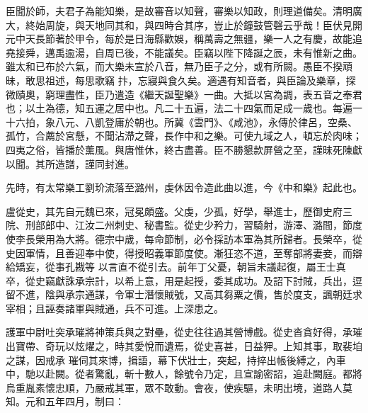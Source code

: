 \begin{pinyinscope}
 臣聞於師，夫君子為能知樂，是故審音以知聲，審樂以知政，則理道備矣。清明廣大，終始周旋，與天地同其和，與四時合其序，豈止於鐘鼓管磬云乎哉！臣伏見開元中天長節著於甲令，每於是日海縣歡娛，稱萬壽之無疆，樂一人之有慶，故能追堯接舜，邁禹逾湯，自周已後，不能議矣。臣竊以陛下降誕之辰，未有惟新之曲。雖太和已布於六氣，而大樂未宣於八音，無乃臣子之分，或有所闕。愚臣不揆頑昧，敢思祖述，每思歌竊
 抃，忘寢與食久矣。適遇有知音者，與臣論及樂章，探微賾奧，窮理盡性，臣乃遣造《繼天誕聖樂》一曲。大抵以宮為調，表五音之奉君也；以土為德，知五運之居中也。凡二十五遍，法二十四氣而足成一歲也。每遍一十六拍，象八元、八凱登庸於朝也。所冀《雲門》、《咸池》，永傳於律呂，空桑、孤竹，合薦於宮懸，不聞沾滯之聲，長作中和之樂。可使九域之人，頓忘於肉味；四夷之俗，皆播於薰風。與唐惟休，終古盡善。臣不勝懇款屏營之至，謹昧死陳獻
 以聞。其所造譜，謹同封進。



 先時，有太常樂工劉玠流落至潞州，虔休因令造此曲以進，今《中和樂》起此也。



 盧從史，其先自元魏已來，冠冕頗盛。父虔，少孤，好學，舉進士，歷御史府三院、刑部郎中、江汝二州刺史、秘書監。從史少矜力，習騎射，游澤、潞間，節度使李長榮用為大將。德宗中歲，每命節制，必令採訪本軍為其所歸者。長榮卒，從史因軍情，且善迎奉中使，得授昭義軍節度使。漸狂恣不道，至奪部將妻妾，而辯給矯妄，從事孔戡等
 以言直不從引去。前年丁父憂，朝旨未議起復，屬王士真卒，從史竊獻誅承宗計，以希上意，用是起授，委其成功。及詔下討賊，兵出，逗留不進，陰與承宗通謀，令軍士潛懷賊號，又高其芻粟之價，售於度支，諷朝廷求宰相；且誣奏諸軍與賊通，兵不可進。上深患之。



 護軍中尉吐突承璀將神策兵與之對壘，從史往往過其營博戲。從史沓貪好得，承璀出寶帶、奇玩以炫燿之，時其愛悅而遺焉，從史喜甚，日益狎。上知其事，取裴垍之謀，因戒承
 璀伺其來博，揖語，幕下伏壯士，突起，持捽出帳後縛之，內車中，馳以赴闕。從者驚亂，斬十數人，餘號令乃定，且宣諭密詔，追赴闕庭。都將烏重胤素懷忠順，乃嚴戒其軍，眾不敢動。會夜，使疾驅，未明出境，道路人莫知。元和五年四月，制曰：




\end{pinyinscope}
